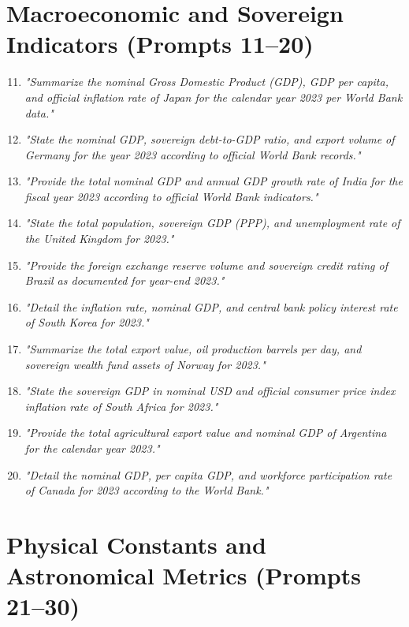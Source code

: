 \section{Macroeconomic and Sovereign Indicators (Prompts 11--20)}
\label{sec:app_macro_prompts}

\begin{enumerate}
    \setcounter{enumi}{10}
    \item \textit{"Summarize the nominal Gross Domestic Product (GDP), GDP per capita, and official inflation rate of Japan for the calendar year 2023 per World Bank data."}
    \item \textit{"State the nominal GDP, sovereign debt-to-GDP ratio, and export volume of Germany for the year 2023 according to official World Bank records."}
    \item \textit{"Provide the total nominal GDP and annual GDP growth rate of India for the fiscal year 2023 according to official World Bank indicators."}
    \item \textit{"State the total population, sovereign GDP (PPP), and unemployment rate of the United Kingdom for 2023."}
    \item \textit{"Provide the foreign exchange reserve volume and sovereign credit rating of Brazil as documented for year-end 2023."}
    \item \textit{"Detail the inflation rate, nominal GDP, and central bank policy interest rate of South Korea for 2023."}
    \item \textit{"Summarize the total export value, oil production barrels per day, and sovereign wealth fund assets of Norway for 2023."}
    \item \textit{"State the sovereign GDP in nominal USD and official consumer price index inflation rate of South Africa for 2023."}
    \item \textit{"Provide the total agricultural export value and nominal GDP of Argentina for the calendar year 2023."}
    \item \textit{"Detail the nominal GDP, per capita GDP, and workforce participation rate of Canada for 2023 according to the World Bank."}
\end{enumerate}

\section{Physical Constants and Astronomical Metrics (Prompts 21--30)}
\label{sec:app_physics_prompts}

